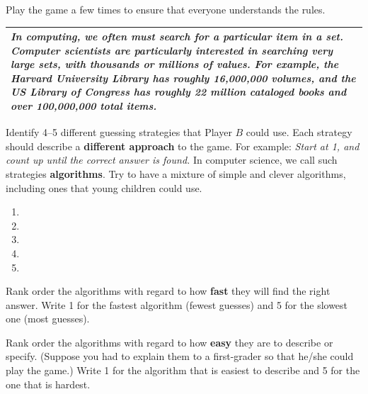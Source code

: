 \begin{answer}[2em]
\end{answer}


\Q Play the game a few times to ensure that everyone understands the rules.

\vspace{1ex}


\begin{center}
\begin{tabularx}{\linewidth}{|X|}
\hline
\it
In computing, we often must search for a particular item in a set.
Computer scientists are particularly interested in searching very large sets, with thousands or millions of values.
For example, the Harvard University Library has roughly 16,000,000 volumes, and the US Library of Congress has roughly 22 million cataloged books and over 100,000,000 total items.
\\
\hline
\end{tabularx}
\end{center}


\Q Identify 4--5 different guessing strategies that Player $B$ could use.
Each strategy should describe a \textbf{different approach} to the game.
For example: \textit{Start at 1, and count up until the correct answer is found.}
In computer science, we call such strategies \textbf{algorithms}.
Try to have a mixture of simple and clever algorithms, including ones that young children could use.

\begin{enumerate}
\item 
\item 
\item 
\item 
\item 
\end{enumerate}


\Q Rank order the algorithms with regard to how \textbf{fast} they will find the right answer.
Write 1 for the fastest algorithm (fewest guesses) and 5 for the slowest one (most guesses).

\begin{answer}
\end{answer}


\Q Rank order the algorithms with regard to how \textbf{easy} they are to describe or specify.
(Suppose you had to explain them to a first-grader so that he/she could play the game.)
Write 1 for the algorithm that is easiest to describe and 5 for the one that is hardest.

\begin{answer}
\end{answer}


